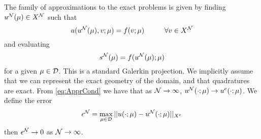 The family of approximations to the exact problems is given by finding $u^{\mathcal{N}}({\mathbf{\mu}}) \in X^{\mathcal{N}}$ such that
\begin{equation}
a(u^{\mathcal{N}}({\mathbf{\mu}}),v;{\mathbf{\mu}})=f(v;\mu) \hspace{1cm} \forall v \in X^{\mathcal{N}}
\end{equation}
and evaluating 
\begin{equation}
s^{\mathcal{N}}({\mathbf{\mu}})=f(u^{\mathcal{N}}({\mathbf{\mu}}); {\mathbf{\mu}})
\end{equation}
for a given ${\mathbf{\mu}} \in \mathcal{D}$. This is a standard Galerkin projection. We implicitly assume that we can represent the exact geometry of the domain, and that quadratures are exact. From \ref{eq:ApprCond} we have that as $\mathcal{N} \rightarrow \infty$, $u^{\mathcal{N}}(\cdot;{\mathbf{\mu}})\rightarrow u^e(\cdot;{\mathbf{\mu}})$. We define the error
\begin{equation}
\epsilon^{\mathcal{N}}=\max_{{\mathbf{\mu}} \in \mathcal{D}} || u(\cdot;{\mathbf{\mu}})-u^{\mathcal{N}}(\cdot;{\mathbf{\mu}}) ||_{X^e}
\end{equation}
then $\epsilon^{\mathcal{N}}\rightarrow 0$ as $\mathcal{N} \rightarrow \infty$.

